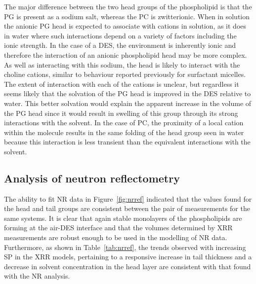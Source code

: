 The major difference between the two head groups of the phospholipid is that the PG is present as a sodium salt, whereas the PC is zwitterionic.
When in solution the anionic PG head is expected to associate with cations in solution, as it does in water\autocite{grigoriev_effect_1999} where such interactions depend on a variety of factors including the ionic strength.
In the case of a DES, the environment is inherently ionic and therefore the interaction of an anionic phospholipid head may be more complex.
As well as interacting with this sodium, the head is likely to interact with the choline cations, similar to behaviour reported previously for surfactant micelles.\autocite{sanchez-fernandez_counterion_2018}
The extent of interaction with each of the cations is unclear, but regardless it seems likely that the solvation of the PG head is improved in the DES relative to water.
This better solvation would explain the apparent increase in the volume of the PG head since it would result in swelling of this group through its strong interactions with the solvent.
In the case of PC, the proximity of a local cation within the molecule results in the same folding of the head group seen in water because this interaction is less transient than the equivalent interactions with the solvent.

\subsection{Analysis of neutron reflectometry}
The ability to fit NR data in Figure~\ref{fig:nrref} indicated that the values found for the head and tail groups are consistent between the pair of measurements for the same systems.
It is clear that again stable monolayers of the phospholipids are forming at the air-DES interface and that the volumes determined by XRR measurements are robust enough to be used in the modelling of NR data.
Furthermore, as shown in Table~\ref{tab:nrref}, the trends observed with increasing SP in the XRR models, pertaining to a responsive increase in tail thickness and a decrease in solvent concentration in the head layer are consistent with that found with the NR analysis.

